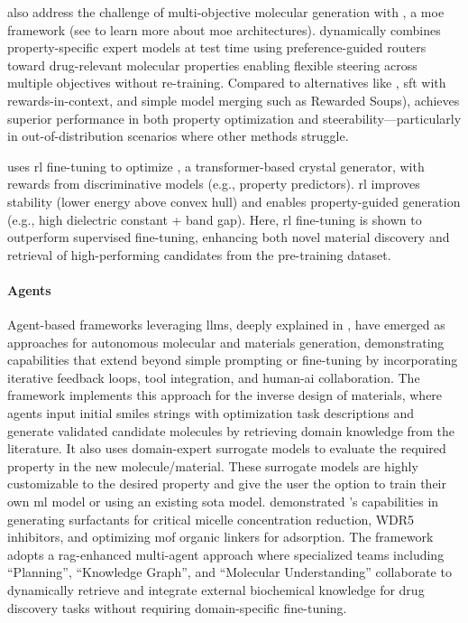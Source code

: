 \textcite{calanzone2025mol-moe} also address the challenge of multi-objective molecular generation with , a \gls{moe} framework (see  to learn more about \gls{moe} architectures).  dynamically combines property-specific expert models at test time using preference-guided routers toward drug-relevant molecular properties enabling flexible steering across multiple objectives without re-training. Compared to alternatives like \autocite{zhou2024one-preference-fits-all}, \gls{sft} with rewards-in-context, and simple model merging such as Rewarded Soups\autocite{rame2023rewarded}),  achieves superior performance in both property optimization and steerability---particularly in out-of-distribution scenarios where other methods struggle. 

 uses \gls{rl} fine-tuning to optimize \autocite{cao2024space}, a transformer-based crystal generator, with rewards from discriminative models (e.g., property predictors)\autocite{cao2025crystalformer-rl}. \gls{rl} improves stability (lower energy above convex hull) and enables property-guided generation (e.g., high dielectric constant + band gap). Here, \gls{rl} fine-tuning is shown to outperform supervised fine-tuning, enhancing both novel material discovery and retrieval of high-performing candidates from the pre-training dataset.

\paragraph{Agents} Agent-based frameworks leveraging \glspl{llm}, deeply explained in , have emerged as approaches for autonomous molecular and materials generation, demonstrating capabilities that extend beyond simple prompting or fine-tuning by incorporating iterative feedback loops, tool integration, and human-\gls{ai} collaboration. 
The  framework implements this approach for the inverse design of materials, where agents input initial \gls{smiles} strings with optimization task descriptions and generate validated candidate molecules by retrieving domain knowledge from the literature.\autocite{ansari2024dziner} 
It also uses domain-expert surrogate models to evaluate the required property in the new molecule/material. 
These surrogate models are highly customizable to the desired property and give the user the option to train their own \gls{ml} model or using an existing \gls{sota} model. \textcite{ansari2024dziner} demonstrated 's capabilities in generating surfactants for critical micelle concentration reduction, WDR5 inhibitors, and optimizing \gls{mof} organic linkers for  adsorption. The  framework adopts a \gls{rag}-enhanced multi-agent approach where specialized teams including \enquote{Planning}, \enquote{Knowledge Graph}, and \enquote{Molecular Understanding} collaborate to dynamically retrieve and integrate external biochemical knowledge for drug discovery tasks without requiring domain-specific fine-tuning.\autocite{lee2025rag-enhanced}

